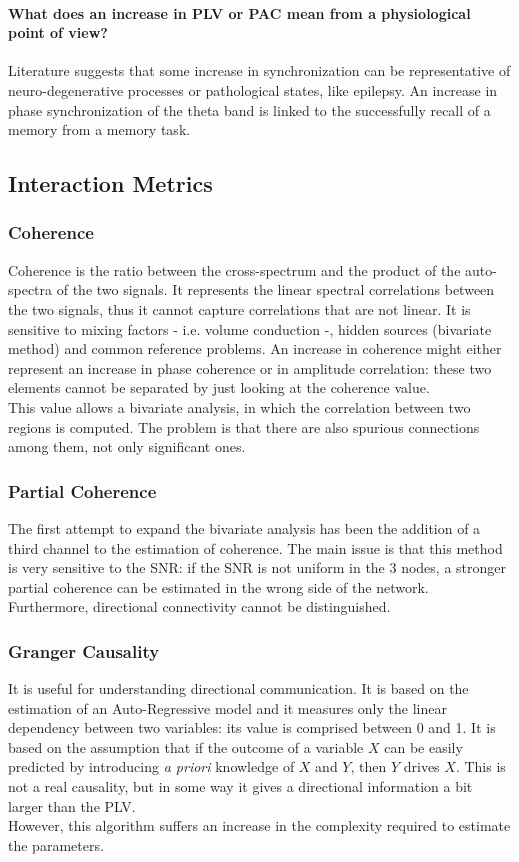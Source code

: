\paragraph{What does an increase in PLV or PAC mean from a physiological point of view?}
Literature suggests that some increase in synchronization can be representative of neuro-degenerative
processes or pathological states, like epilepsy. An increase in phase synchronization of the theta band
is linked to the successfully recall of a memory from a memory task.

\subsection{Interaction Metrics}
\subsubsection{Coherence}
Coherence is the ratio between the cross-spectrum and the product of the auto-spectra of the two signals. It represents the linear spectral correlations between the two
signals, thus it cannot capture correlations that are not linear. It is sensitive to mixing factors - i.e. volume conduction -, hidden sources (bivariate method) and
common reference problems. An increase in coherence might either represent an increase in phase coherence or in amplitude correlation: these two elements cannot be
separated by just looking at the coherence value.\\
This value allows a bivariate analysis, in which the correlation between two regions is computed. The problem is that there are also spurious connections among them,
not only significant ones.
\subsubsection{Partial Coherence}
The first attempt to expand the bivariate analysis has been the addition of a third channel to the estimation of coherence. The main issue is that this method is very
sensitive to the SNR: if the SNR is not uniform in the 3 nodes, a stronger partial coherence can be estimated in the wrong side of the network. Furthermore, directional
connectivity cannot be distinguished.
\subsubsection{Granger Causality}
It is useful for understanding directional communication. It is based on the estimation of an Auto-Regressive model and it measures only the linear dependency between
two variables: its value is comprised between 0 and 1. It is based on the assumption that if the outcome of a variable \(X\) can be easily predicted by introducing
\textit{a priori} knowledge of \(X\) and \(Y\), then \(Y\) drives \(X\). This is not a real causality, but in some way it gives a directional information a bit larger
than the PLV.\\
However, this algorithm suffers an increase in the complexity required to estimate the parameters.
